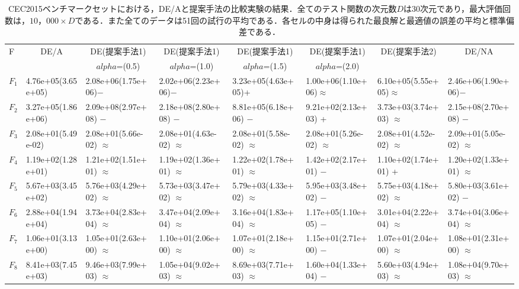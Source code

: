 \documentclass[a4paper,11pt,oneside,openany]{jsbook}
\begin{document}
\newpage
\begin{landscape}
\begin{table}[!tbp]
\footnotesize
\caption{CEC2015ベンチマークセットにおける，DE/Aと提案手法の比較実験の結果．全てのテスト関数の次元数$D$は30次元であり，最大評価回数は，$10，000 \times D$である．また全てのデータは51回の試行の平均である．各セルの中身は得られた最良解と最適値の誤差の平均と標準偏差である．\label{ref-tb-values}} 
\begin{center}
\begin{tabular}{llllllll}
\hline\hline
\multicolumn{1}{l}{F}&\multicolumn{1}{c}{DE/A}&\multicolumn{1}{c}{DE(提案手法1)}&\multicolumn{1}{c}{DE(提案手法1)}&\multicolumn{1}{c}{DE(提案手法1)}&\multicolumn{1}{c}{DE(提案手法1)}&\multicolumn{1}{c}{DE(提案手法2)}&\multicolumn{1}{c}{DE/NA}\tabularnewline
&&\multicolumn{1}{c}{{\scriptsize $alpha$=(0.5)}}&\multicolumn{1}{c}{{\scriptsize $alpha$=(1.0)}}&\multicolumn{1}{c}{{\scriptsize $alpha$=(1.5)}}&\multicolumn{1}{c}{{\scriptsize $alpha$=(2.0)}}&&\tabularnewline
\hline
$F_{1}$&4.76e+05(3.65e+05)&2.08e+06(1.75e+06)−&2.02e+06(2.23e+06)−&3.23e+05(4.63e+05)+&1.00e+06(1.10e+06)$\approx$&6.10e+05(5.55e+05)$\approx$&2.46e+06(1.90e+06)−\tabularnewline
$F_{2}$&3.27e+05(1.86e+06)&2.09e+08(2.97e+08) −&2.18e+08(2.80e+08) −&8.81e+05(6.18e+06) −&9.21e+02(2.13e+03) +&3.73e+03(3.74e+03) $\approx$&2.15e+08(2.70e+08) −\tabularnewline
$F_{3}$&2.08e+01(5.49e-02)&2.08e+01(5.66e-02) $\approx$&2.08e+01(4.63e-02) $\approx$&2.08e+01(5.58e-02) $\approx$&2.08e+01(5.26e-02) $\approx$&2.08e+01(4.52e-02) $\approx$&2.09e+01(5.05e-02) $\approx$\tabularnewline
$F_{4}$&1.19e+02(1.28e+01)&1.21e+02(1.51e+01) $\approx$&1.19e+02(1.36e+01) $\approx$&1.22e+02(1.78e+01) $\approx$&1.42e+02(2.17e+01) −&1.10e+02(1.74e+01) +&1.20e+02(1.33e+01) $\approx$\tabularnewline
$F_{5}$&5.67e+03(3.45e+02)&5.76e+03(4.29e+02) $\approx$&5.73e+03(3.47e+02) $\approx$&5.79e+03(4.33e+02) $\approx$&5.95e+03(3.48e+02) −&5.75e+03(4.18e+02) $\approx$&5.80e+03(3.61e+02) −\tabularnewline
$F_{6}$&2.88e+04(1.94e+04)&3.73e+04(2.83e+04) $\approx$&3.47e+04(2.09e+04) $\approx$&3.16e+04(1.83e+04) $\approx$&1.17e+05(1.10e+05) −&3.01e+04(2.22e+04) $\approx$&3.74e+04(3.06e+04) $\approx$\tabularnewline
$F_{7}$&1.06e+01(3.13e+00)&1.05e+01(2.63e+00) $\approx$&1.10e+01(2.06e+00) $\approx$&1.07e+01(2.18e+00) $\approx$&1.15e+01(2.71e+00) −&1.07e+01(2.04e+00) $\approx$&1.08e+01(2.31e+00) $\approx$\tabularnewline
$F_{8}$&8.41e+03(7.45e+03)&9.46e+03(7.99e+03) $\approx$&1.05e+04(9.02e+03) $\approx$&8.69e+03(7.71e+03) $\approx$&1.60e+04(1.33e+04) −&5.60e+03(4.94e+03) $\approx$&1.08e+04(9.70e+03) $\approx$\tabularnewline

\end{tabular}
\end{center}
\end{table}
\end{landscape}
\end{document}
